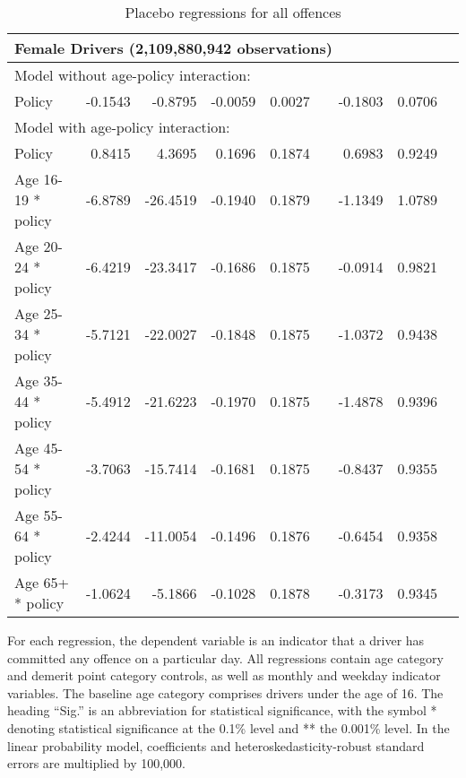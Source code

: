 \begin{table}
\begin{tabular}{l r r r r l r r l}
\hline 

\multicolumn{8}{l}{\textbf{Female Drivers} (2,109,880,942  observations)} \\ 

\hline
\multicolumn{8}{l}{Model without age-policy interaction: } \\ 
Policy                   &  -0.1543        &  -0.8795       &  -0.0059        &  0.0027       &            &  -0.1803        &  0.0706       &            \\ 
\hline
\multicolumn{8}{l}{Model with age-policy interaction: } \\ 
Policy                   &  0.8415        &  4.3695       &  0.1696        &  0.1874       &            &  0.6983        &  0.9249       &            \\ 
Age 16-19 * policy   &  -6.8789        &  -26.4519       &  -0.1940        &  0.1879       &            &  -1.1349        &  1.0789       &            \\ 
Age 20-24 * policy   &  -6.4219        &  -23.3417       &  -0.1686        &  0.1875       &            &  -0.0914        &  0.9821       &            \\ 
Age 25-34 * policy   &  -5.7121        &  -22.0027       &  -0.1848        &  0.1875       &            &  -1.0372        &  0.9438       &            \\ 
Age 35-44 * policy   &  -5.4912        &  -21.6223       &  -0.1970        &  0.1875       &            &  -1.4878        &  0.9396       &            \\ 
Age 45-54 * policy   &  -3.7063        &  -15.7414       &  -0.1681        &  0.1875       &            &  -0.8437        &  0.9355       &            \\ 
Age 55-64 * policy   &  -2.4244        &  -11.0054       &  -0.1496        &  0.1876       &            &  -0.6454        &  0.9358       &            \\ 
Age 65+ * policy   &  -1.0624        &  -5.1866       &  -0.1028        &  0.1878       &            &  -0.3173        &  0.9345       &            \\ 

\hline 

\end{tabular} 
\caption{Placebo regressions for all offences} 
For each regression, the dependent variable is an indicator that a driver has committed  
any offence on a particular day.  
All regressions contain age category and demerit point category controls, 
as well as monthly and weekday indicator variables. 
The baseline age category comprises drivers under the age of 16. 
The heading ``Sig.'' is an abbreviation for statistical significance, with 
the symbol * denoting statistical significance at the 0.1\% level 
and ** the 0.001\% level. 
In the linear probability model, coefficients and heteroskedasticity-robust standard errors are  
multiplied by 100,000.  
\label{tab:seas_Logit_vs_LPMx100K_placebo_regs} 
\end{table} 
 

